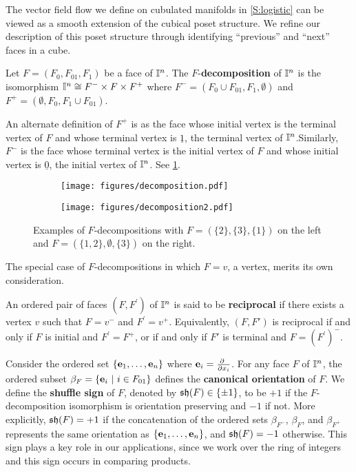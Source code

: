 The vector field flow we define on cubulated manifolds in \cref{S:logistic} can be viewed as a smooth extension of the cubical poset structure.
We refine our description of this poset structure through identifying ``previous'' and ``next'' faces in a cube.

\begin{definition}\label{D:F decomposition}
	Let $F = (F_0, F_{01}, F_1)$ be a face of $\mathbb{I}^n$. The $F$-\textbf{decomposition} of $\mathbb{I}^n$ is the isomorphism $\mathbb{I}^n \cong F^- \times F \times F^+$ where $F^- = (F_0 \cup F_{01}, F_1, \emptyset)$ and $F^+ = (\emptyset, F_0, F_1 \cup F_{01})$.
\end{definition}

An alternate definition of $F^+$ is as the face whose initial vertex is the terminal vertex of $F$ and whose terminal vertex is $\underline{1}$,
the terminal vertex of $\mathbb{I}^n$.Similarly, $F^-$ is the face whose terminal vertex is the initial vertex of $F$ and whose initial vertex is $\underline{0}$, the initial vertex of $\mathbb{I}^n$. See \cref{F:decomposition}.

\begin{figure}[h!]
	\begin{subfigure}[b]{0.35\textwidth}
		\centering
		\texttt{[image: figures/decomposition.pdf]}
	\end{subfigure}
	\begin{subfigure}[b]{0.35\textwidth}
		\centering
		\texttt{[image: figures/decomposition2.pdf]}
	\end{subfigure}
	\caption{Examples of $F$-decompositions with $F = (\{2\}, \{3\}, \{1\})$ on the left and $F = (\{1,2\}, \emptyset, \{3\})$ on the right.}
	\label{F:decomposition}
\end{figure}

The special case of $F$-decompositions in which $F = v$, a vertex, merits its own consideration.

\begin{definition}\label{D:reciprocal}
	An ordered pair of faces $(F,F^\prime)$ of $\mathbb{I}^n$ is said to be \textbf{reciprocal} if there exists a vertex $v$ such that $F = v^-$ and $F^\prime = v^+$. Equivalently, $(F, F')$ is reciprocal if and only if $F$ is initial and $F^\prime = F^+$, or if and only if $F'$ is terminal and $F = (F^{\prime})^-$.
\end{definition}

Consider the ordered set $\{\mathbf{e}_1, \dots, \mathbf{e}_n\}$ where $\e_i = \frac{\partial\ }{\partial x_i}$.
For any face $F$ of $\mathbb{I}^n$, the ordered subset $\beta_F = \{\mathbf{e}_i\ |\ i \in F_{01}\}$ defines the \textbf{canonical orientation} of $F$.
We define the \textbf{shuffle sign} of $F$, denoted by $\mathfrak{sh}(F) \in \{\pm 1\}$, to be $+1$ if the $F$-decomposition isomorphism is orientation preserving and $-1$ if not.
More explicitly, $\mathfrak{sh}(F) = +1$ if the concatenation of the ordered sets $\beta_{F^-}$, $\beta_{F}$, and $\beta_{F^+}$ represents the same orientation as $\{\mathbf{e}_1, \dots, \mathbf{e}_n\}$, and $\mathfrak{sh}(F) = -1$ otherwise.
This sign plays a key role in our applications, since we work over the ring of integers and this sign occurs in comparing products.

